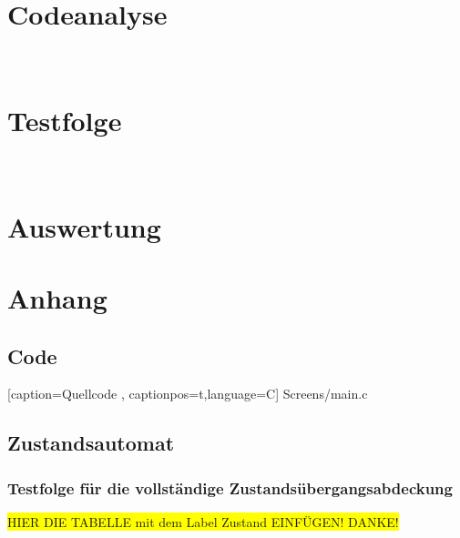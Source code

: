 \documentclass[10pt,a4paper]{article}
\newcommand{\hilight}[1]{\colorbox{yellow}{#1}}
\begin{document}
\section{Codeanalyse}

\ \\


\newpage
\section{Testfolge}

\ \\
\section{Auswertung}
\section{Anhang}
\subsection{Code}

    [caption={Quellcode}
       \label{lst:cClass},
       captionpos=t,language=C]
 {Screens/main.c}
\subsection{Zustandsautomat}


\subsubsection{Testfolge für die vollständige Zustandsübergangsabdeckung}
\hilight{HIER DIE TABELLE mit dem Label Zustand EINFÜGEN! DANKE!}
\end{document}
